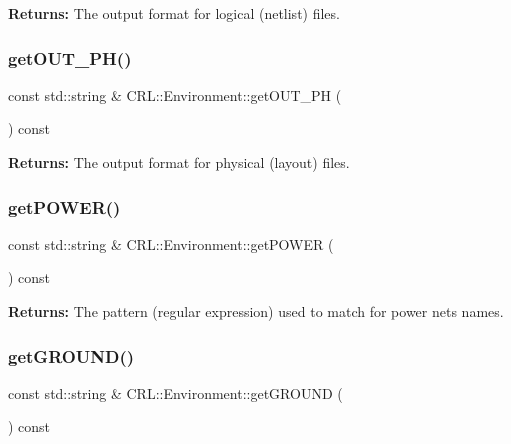 {\bfseries Returns\+:} The output format for logical (netlist) files. \mbox{\label{classCRL_1_1Environment_a14c2dbaef6177f80bf76cfcae7933e20}} 
\subsubsection{\texorpdfstring{get\+O\+U\+T\+\_\+\+P\+H()}{getOUT\_PH()}}
{\footnotesize\ttfamily const std\+::string \& C\+R\+L\+::\+Environment\+::get\+O\+U\+T\+\_\+\+PH (\begin{DoxyParamCaption}{ }\end{DoxyParamCaption}) const\hspace{0.3cm}{\ttfamily [inline]}}

{\bfseries Returns\+:} The output format for physical (layout) files. \mbox{\label{classCRL_1_1Environment_a7d1ab4e7ca026c88f73ceca3876d0de9}} 
\subsubsection{\texorpdfstring{get\+P\+O\+W\+E\+R()}{getPOWER()}}
{\footnotesize\ttfamily const std\+::string \& C\+R\+L\+::\+Environment\+::get\+P\+O\+W\+ER (\begin{DoxyParamCaption}{ }\end{DoxyParamCaption}) const\hspace{0.3cm}{\ttfamily [inline]}}

{\bfseries Returns\+:} The pattern (regular expression) used to match for power nets names. \mbox{\label{classCRL_1_1Environment_a14cc8ac50482a5a8c47f934aaf995ed5}} 
\subsubsection{\texorpdfstring{get\+G\+R\+O\+U\+N\+D()}{getGROUND()}}
{\footnotesize\ttfamily const std\+::string \& C\+R\+L\+::\+Environment\+::get\+G\+R\+O\+U\+ND (\begin{DoxyParamCaption}{ }\end{DoxyParamCaption}) const\hspace{0.3cm}{\ttfamily [inline]}}

